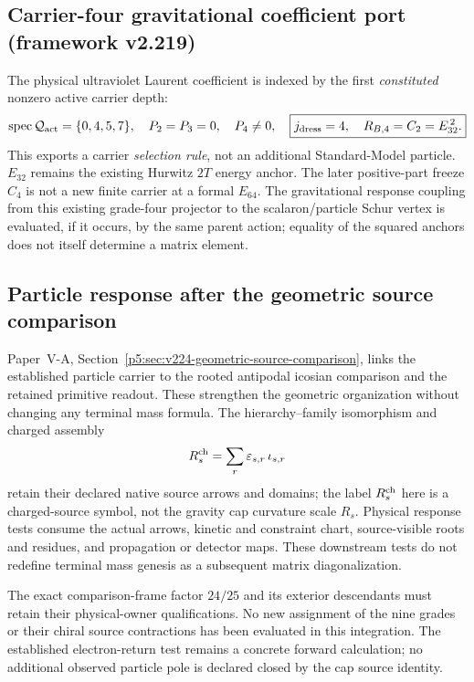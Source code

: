 \documentclass[12pt,a4paper]{article}
\begin{document}
\subsection{Carrier-four gravitational coefficient port (framework v2.219)}
\label{p5b:sec:v2219-next-carrier-port}
The physical ultraviolet Laurent coefficient is indexed by the first
\emph{constituted} nonzero active carrier depth:
\[
 \operatorname{spec}\mathcal Q_{\rm act}=\{0,4,5,7\},\quad
 P_2=P_3=0,\quad P_4\ne0,\quad
 \boxed{j_{\rm dress}=4,\quad R_{B,4}=C_2=E_{32}^{\,2}.}
\]
This exports a carrier \emph{selection rule}, not an additional
Standard-Model particle. $E_{32}$ remains the existing Hurwitz $2T$
energy anchor. The later positive-part freeze $C_4$ is not a new
finite carrier at a formal $E_{64}$.  The gravitational response coupling
from this existing grade-four projector to the scalaron/particle Schur
vertex is evaluated, if it occurs, by the same parent action; equality
of the squared anchors does not itself determine a matrix element.


\subsection{Particle response after the geometric source comparison}
\label{p5b:sec:v224-source-response-status}
Paper~V-A, Section~\ref{p5:sec:v224-geometric-source-comparison}, links
the established particle carrier to the rooted antipodal icosian
comparison and the retained primitive readout. These strengthen the
geometric organization without changing any terminal mass formula.
The hierarchy--family isomorphism and charged assembly
\[
 R_s^{\rm ch}=\sum_r\varepsilon_{s,r}\,\iota_{s,r}
\]
retain their declared native source arrows and domains; the label
$R_s^{\rm ch}$ here is a charged-source symbol, not the gravity cap
curvature scale $R_s$. Physical response tests consume the actual arrows,
kinetic and constraint chart, source-visible roots and residues, and
propagation or detector maps. These downstream tests do not redefine
terminal mass genesis as a subsequent matrix diagonalization.

The exact comparison-frame factor $24/25$ and its exterior descendants
must retain their physical-owner qualifications. No new assignment of
the nine grades or their chiral source contractions has been evaluated
in this integration. The established electron-return test remains a
concrete forward calculation; no additional observed particle pole is
declared closed by the cap source identity.
\end{document}

